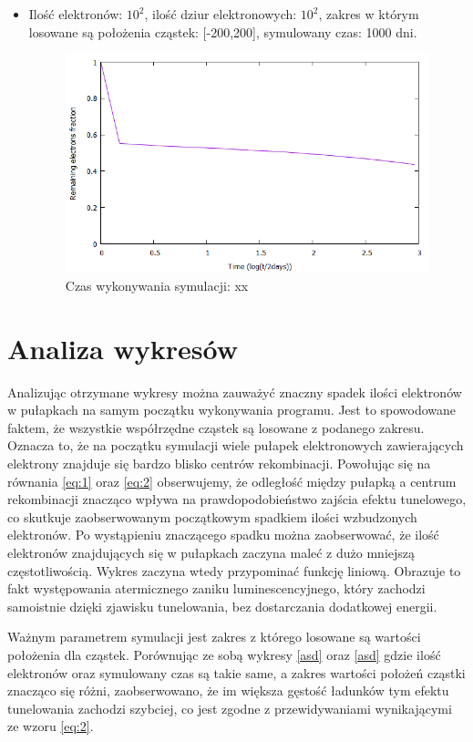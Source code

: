 \begin{itemize}
\item Ilość elektronów: $10^{2}$, ilość dziur elektronowych: $10^{2}$, zakres w którym losowane są położenia cząstek: [-200,200], symulowany czas: 1000 dni.
\begin{figure}[H]
\centering
\includegraphics[width=17cm]{wykres2}
\caption{ Czas wykonywania symulacji: xx}
\label{fig:Tunelowanie}
\end{figure}




\end{itemize}
\section{Analiza wykresów}
Analizując otrzymane wykresy można zauważyć znaczny spadek ilości elektronów w pułapkach na samym początku wykonywania programu. Jest to spowodowane faktem, że wszystkie współrzędne cząstek są losowane z podanego zakresu. Oznacza to, że na początku symulacji wiele pułapek elektronowych zawierających elektrony znajduje się bardzo blisko centrów rekombinacji. Powołując się na równania \ref{eq:1} oraz \ref{eq:2} obserwujemy, że odległość między pułapką a centrum rekombinacji znacząco wpływa na prawdopodobieństwo zajścia efektu tunelowego, co skutkuje zaobserwowanym początkowym spadkiem ilości wzbudzonych elektronów. Po wystąpieniu znaczącego spadku można zaobserwować, że ilość elektronów znajdujących się w pułapkach zaczyna maleć z dużo mniejszą częstotliwością. Wykres zaczyna wtedy przypominać funkcję liniową. Obrazuje to fakt występowania atermicznego zaniku luminescencyjnego, który zachodzi samoistnie dzięki zjawisku tunelowania, bez dostarczania dodatkowej energii. 

Ważnym parametrem symulacji jest zakres z którego losowane są wartości położenia dla cząstek. Porównując ze sobą wykresy \ref{asd} oraz \ref{asd} gdzie ilość elektronów oraz symulowany czas są takie same, a zakres wartości położeń cząstki znacząco się różni, zaobserwowano, że im większa gęstość ładunków tym efektu tunelowania zachodzi szybciej, co jest zgodne z przewidywaniami wynikającymi ze wzoru \ref{eq:2}.
